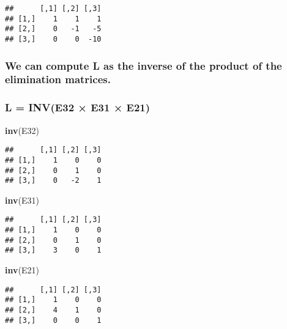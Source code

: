 \documentclass[
]{article}
\newenvironment{Shaded}{\begin{snugshade}}{\end{snugshade}}
\newcommand{\FunctionTok}[1]{\textcolor[rgb]{0.13,0.29,0.53}{\textbf{#1}}}
\newcommand{\NormalTok}[1]{#1}
\begin{document}
\begin{verbatim}
##      [,1] [,2] [,3]
## [1,]    1    1    1
## [2,]    0   -1   -5
## [3,]    0    0  -10
\end{verbatim}

\hypertarget{we-can-compute-l-as-the-inverse-of-the-product-of-the-elimination-matrices.}{%
\subsubsection{We can compute L as the inverse of the product of the
elimination
matrices.}\label{we-can-compute-l-as-the-inverse-of-the-product-of-the-elimination-matrices.}}

\hypertarget{l-inve32-e31-e21}{%
\subsubsection{L = INV(E32 × E31 × E21)}\label{l-inve32-e31-e21}}

\begin{Shaded}
\begin{Highlighting}[]
\FunctionTok{inv}\NormalTok{(E32)}
\end{Highlighting}
\end{Shaded}

\begin{verbatim}
##      [,1] [,2] [,3]
## [1,]    1    0    0
## [2,]    0    1    0
## [3,]    0   -2    1
\end{verbatim}

\begin{Shaded}
\begin{Highlighting}[]
\FunctionTok{inv}\NormalTok{(E31)}
\end{Highlighting}
\end{Shaded}

\begin{verbatim}
##      [,1] [,2] [,3]
## [1,]    1    0    0
## [2,]    0    1    0
## [3,]    3    0    1
\end{verbatim}

\begin{Shaded}
\begin{Highlighting}[]
\FunctionTok{inv}\NormalTok{(E21)}
\end{Highlighting}
\end{Shaded}

\begin{verbatim}
##      [,1] [,2] [,3]
## [1,]    1    0    0
## [2,]    4    1    0
## [3,]    0    0    1
\end{verbatim}
\end{document}
